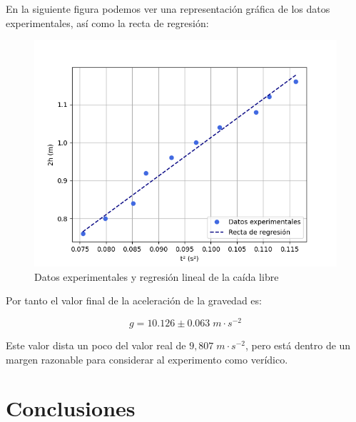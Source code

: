 \documentclass[a4paper,12pt,titlepage]{article}
\begin{document}
En la siguiente figura podemos ver una representación gráfica de los datos experimentales, así como la recta de regresión:

\begin{figure}[h!]
    \centering
    \includegraphics[width=0.75\linewidth]{Images/RegGravedad.png}
    \caption{Datos experimentales y regresión lineal de la caída libre}
\end{figure}

Por tanto el valor final de la aceleración de la gravedad es:

\begin{equation}
    g = 10.126 \pm 0.063 \; m \cdot s^{-2}
\end{equation}

Este valor dista un poco del valor real de $9,807 \; m \cdot s^{-2}$, pero está dentro de un margen razonable para considerar al experimento como verídico.

\section{Conclusiones}
\end{document}
